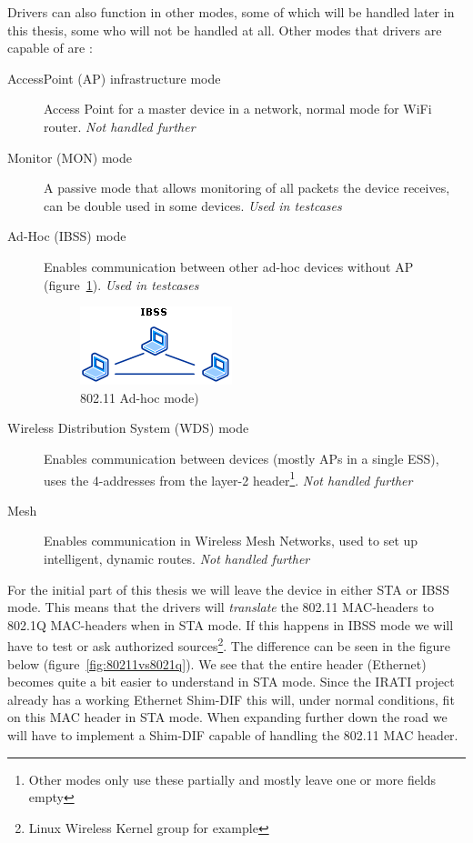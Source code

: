 Drivers can also function in other modes, some of which will be handled later in this thesis, some who will not be handled at all. Other modes that drivers are capable of are \citep{website:80211wirelesskernel}: 
\begin{description}
	\item[AccessPoint (AP) infrastructure mode] Access Point for a master device in a network, normal mode for WiFi router. \emph{Not handled further}
	\item[Monitor (MON) mode] A passive mode that allows monitoring of all packets the device receives, can be double used in some devices. \emph{Used in testcases}
	\item[Ad-Hoc (IBSS) mode] Enables communication between other ad-hoc devices without AP (figure~\ref{fig:80211adhoc}). \emph{Used in testcases}

\begin{figure}[H]
    \centering
    \includegraphics{figures/80211adhoc}
    \caption{802.11 Ad-hoc mode) \citep{website:80211microsoft}} 
    \label{fig:80211adhoc}
\end{figure}

	\item[Wireless Distribution System (WDS) mode] Enables communication between devices (mostly APs in a single ESS), uses the 4-addresses from the layer-2 header\footnote{Other modes only use these partially and mostly leave one or more fields empty}. \emph{Not handled further}
	\item[Mesh] Enables communication in Wireless Mesh Networks, used to set up intelligent, dynamic routes. \emph{Not handled further}
 \end{description}


\npar

For the initial part of this thesis we will leave the device in either STA or IBSS mode. This means that the drivers will \emph{translate} the 802.11 MAC-headers to 802.1Q MAC-headers when in STA mode. If this happens in IBSS mode we will have to test or ask authorized sources\footnote{Linux Wireless Kernel group for example}. The difference can be seen in the figure below (figure~\ref{fig:80211vs8021q}). We see that the entire header (Ethernet) becomes quite a bit easier to understand in STA mode. Since the IRATI project already has a working Ethernet Shim-DIF this will, under normal conditions, fit on this MAC header in STA mode. When expanding further down the road we will have to implement a Shim-DIF capable of handling the 802.11 MAC header. 


